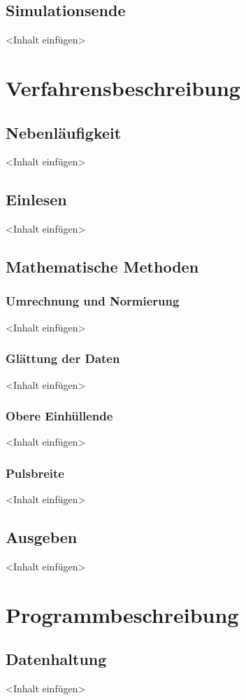 \documentclass[a4paper,12pt]{report}
\begin{document}
\section{Simulationsende}
<Inhalt einfügen>

\chapter{Verfahrensbeschreibung}
\section{Nebenläufigkeit}
<Inhalt einfügen>

\section{Einlesen}
<Inhalt einfügen>

\section{Mathematische Methoden}
\subsection{Umrechnung und Normierung}
<Inhalt einfügen>

\subsection{Glättung der Daten}
<Inhalt einfügen>

\subsection{Obere Einhüllende}
<Inhalt einfügen>

\subsection{Pulsbreite}
<Inhalt einfügen>

\section{Ausgeben}
<Inhalt einfügen>

\chapter{Programmbeschreibung}
\section{Datenhaltung}
<Inhalt einfügen>
\end{document}
